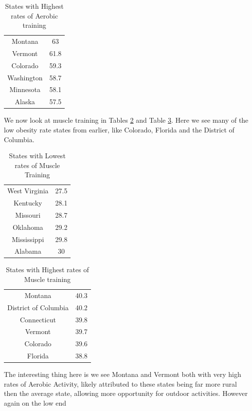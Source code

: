 \documentclass[
]{article}
\begin{document}
\begin{table}[H]

\caption{\label{tab:tab11}States with Highest rates of Aerobic training}
\centering
\begin{tabular}[t]{cc}
\toprule
Montana & 63\\
Vermont & 61.8\\
Colorado & 59.3\\
Washington & 58.7\\
Minnesota & 58.1\\
\addlinespace
Alaska & 57.5\\
\bottomrule
\end{tabular}
\end{table}

We now look at muscle training in Tables \ref{tab:tab12} and Table \ref{tab:tab13}. Here we see many of the low obesity rate states from earlier, like Colorado, Florida and the District of Columbia.

\begin{table}[H]

\caption{\label{tab:tab12}States with Lowest rates of Muscle Training}
\centering
\begin{tabular}[t]{cc}
\toprule
West Virginia & 27.5\\
Kentucky & 28.1\\
Missouri & 28.7\\
Oklahoma & 29.2\\
Mississippi & 29.8\\
\addlinespace
Alabama & 30\\
\bottomrule
\end{tabular}
\end{table}

\begin{table}[H]

\caption{\label{tab:tab13}States with Highest rates of Muscle training}
\centering
\begin{tabular}[t]{cc}
\toprule
Montana & 40.3\\
District of Columbia & 40.2\\
Connecticut & 39.8\\
Vermont & 39.7\\
Colorado & 39.6\\
\addlinespace
Florida & 38.8\\
\bottomrule
\end{tabular}
\end{table}

The interesting thing here is we see Montana and Vermont both with very high rates of Aerobic Activity, likely attributed to these states being far more rural then the average state, allowing more opportunity for outdoor activities. However again on the low end
\newpage
\end{document}
